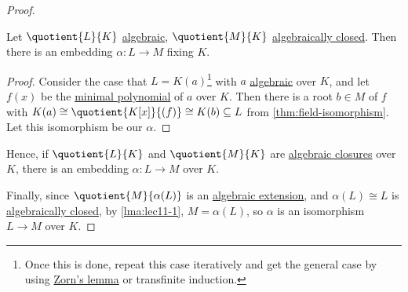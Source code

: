 \begin{proof}
	\begin{lemma}
		Let \(\quotient{L}{K} \) \hyperref[def:algebraic-extension]{algebraic}, \(\quotient{M}{K} \) \hyperref[def:algebraically-closed]{algebraically closed}. Then there is an embedding \(\alpha \colon L \to M\) fixing \(K\).
	\end{lemma}
	\begin{proof}
		Consider the case that \(L = K(a)\)\footnote{Once this is done, repeat this case iteratively and get the general case by using \hyperref[thm:Zorn]{Zorn's lemma} or transfinite induction.} with \(a\) \hyperref[def:algebraic]{algebraic} over \(K\), and let \(f(x)\) be the \hyperref[def:minimal-polynomial]{minimal polynomial} of \(a\) over \(K\). Then there is a root \(b\in M\) of \(f\) with \(K(a) \cong \quotient{K[x]}{(f)} \cong K(b) \subseteq L\) from \autoref{thm:field-isomorphism}. Let this isomorphism be our \(\alpha \).
	\end{proof}
	Hence, if \(\quotient{L}{K} \) and \(\quotient{M}{K} \) are \hyperref[def:algebraic-closure]{algebraic closures} over \(K\), there is an embedding \(\alpha \colon L \to M\) over \(K\).

	Finally, since \(\quotient{M}{\alpha (L)} \) is an \hyperref[def:algebraic-extension]{algebraic extension}, and \(\alpha (L) \cong L\) is \hyperref[def:algebraically-closed]{algebraically closed}, by \autoref{lma:lec11-1}, \(M = \alpha (L)\), so \(\alpha \) is an isomorphism \(L \to M\) over \(K\).
\end{proof}